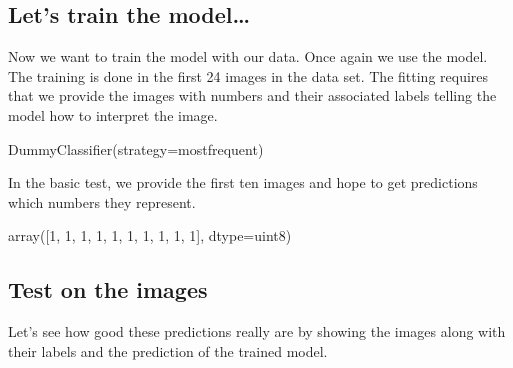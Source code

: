 \documentclass[letterpaper,10pt,english]{sphinxmanual}
\begin{document}
\subsection{Let’s train the model…}
\label{\detokenize{03-Datasets:let-s-train-the-model}}
\sphinxAtStartPar
Now we want to train the model with our data. Once again we use the  model. The training is done in the first 24 images in the data set. The fitting requires that we provide the images with numbers and their associated labels telling the model how to interpret the image.

\begin{sphinxVerbatim}[commandchars=\\\{\}]
  
\PYG{p}{[}\PYG{p}{]} \PYG{p}{[}\PYG{p}{]}
\end{sphinxVerbatim}

\begin{sphinxVerbatim}[commandchars=\\\{\}]
DummyClassifier(strategy=\PYGZsq{}most\PYGZus{}frequent\PYGZsq{})
\end{sphinxVerbatim}

\sphinxAtStartPar
{}

\sphinxAtStartPar
In the basic test, we provide the first ten images and hope to get predictions which numbers they represent.

\begin{sphinxVerbatim}[commandchars=\\\{\}]
\PYG{p}{[}\PYG{p}{]}
\end{sphinxVerbatim}

\begin{sphinxVerbatim}[commandchars=\\\{\}]
array([1, 1, 1, 1, 1, 1, 1, 1, 1, 1], dtype=uint8)
\end{sphinxVerbatim}


\subsection{Test on the images}
\label{\detokenize{03-Datasets:test-on-the-images}}
\sphinxAtStartPar
Let’s see how good these predictions really are by showing the images along with their labels and the prediction of the trained model.
\end{document}
